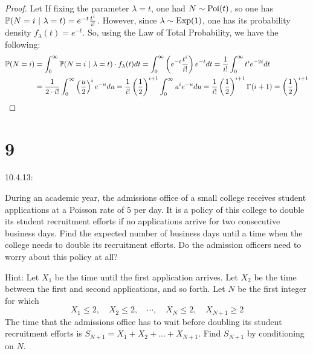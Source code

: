 \documentclass{article}
\begin{document}
\begin{proof}
    Let If fixing the parameter $\lambda=t$, one had $N \sim \mathrm{Poi}(t)$, so one has $\mathbb{P}(N=i\ |\ \lambda =t) = e^{-t}\frac{t^i}{i!}$. However, since $\lambda \sim \mathrm{Exp}(1)$, one has its probability density $f_\lambda(t) = e^{-t}$. So, using the Law of Total Probability, we have the following:
    \begin{align}
        \mathbb{P}(N=i) &= \int_{0}^{\infty}\mathbb{P}(N=i\ |\ \lambda =t)\cdot f_\lambda (t)dt = \int_{0}^{\infty}\left(e^{-t}\frac{t^i}{i!}\right)e^{-t}dt = \frac{1}{i!}\int_{0}^{\infty}t^i e^{-2t}dt\\
        &= \frac{1}{2\cdot i!}\int_{0}^{\infty}\left(\frac{u}{2}\right)^i e^{-u}du = \frac{1}{i!}\left(\frac{1}{2}\right)^{i+1}\int_{0}^{\infty}u^i e^{-u}du = \frac{1}{i!}\left(\frac{1}{2}\right)^{i+1}\Gamma(i+1) = \left(\frac{1}{2}\right)^{i+1}
    \end{align}
\end{proof}

\hfil

\hfil

\section*{9}
\begin{ques}\label{q9}
    10.4.13:

    During an academic year, the admissions office of a small college receives student applications at a Poisson rate of $5$ per day. It is a policy of this college to double its student recruitment efforts if no applications arrive for two consecutive business days. Find the expected number of business days until a time when the college needs to double its recruitment efforts. Do the admission officers need to worry about this policy at all?

    Hint: Let $X_1$ be the time until the first application arrives. Let $X_2$ be the time between the first and second applications, and so forth. Let $N$ be the first integer for which 
    $$X_1\leq 2,\quad X_2\leq 2,\quad \cdots,\quad X_N\leq 2,\quad X_{N+1}\geq 2 $$
    The time that the admissions office has to wait before doubling its student recruitment efforts is $S_{N+1} = X_1+X_2+...+X_{N+1}$. Find $S_{N+1}$ by conditioning on $N$.
\end{ques}
\end{document}
